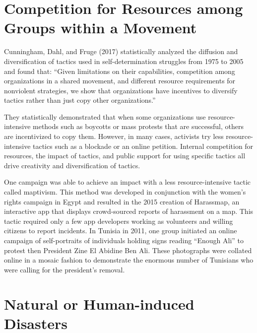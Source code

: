 \documentclass[twoside,a4paper,12pt,fleqn,openany]{extbook}
\begin{document}
\section*{Competition for Resources among Groups within a Movement}

Cunningham, Dahl, and Fruge (2017) statistically analyzed the diffusion and diversification of tactics used in self-determination struggles from 1975 to 2005 and found that: “Given limitations on their capabilities, competition among organizations in a shared movement, and different resource requirements for nonviolent strategies, we show that organizations have incentives to diversify tactics rather than just copy other organizations.”

They statistically demonstrated that when some organizations use resource-intensive methods such as boycotts or mass protests that are successful, others are incentivized to copy them. However, in many cases, activists try less resource-intensive tactics such as a blockade or an online petition. Internal competition for resources, the impact of tactics, and public support for using specific tactics all drive creativity and diversification of tactics.

One campaign was able to achieve an impact with a less resource-intensive tactic called maptivism. This method was developed in conjunction with the women’s rights campaign in Egypt and resulted in the 2015 creation of Harassmap, an interactive app that displays crowd-sourced reports of harassment on a map. This tactic required only a few app developers working as volunteers and willing citizens to report incidents. In Tunisia in 2011, one group initiated an online campaign of self-portraits of individuals holding signs reading “Enough Ali” to protest then President Zine El Abidine Ben Ali. These photographs were collated online in a mosaic fashion to demonstrate the enormous number of Tunisians who were calling for the president’s removal.

\section*{Natural or Human-induced Disasters}
\end{document}
